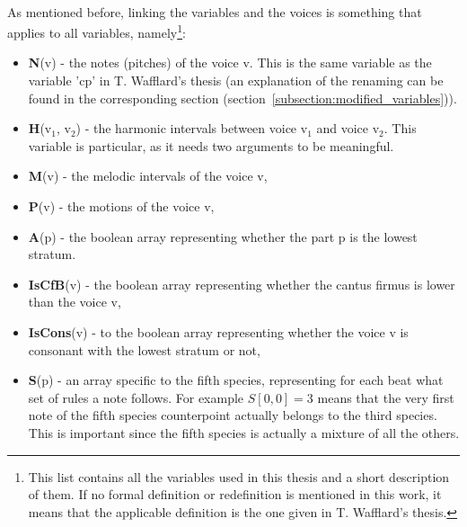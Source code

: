 \paragraph{}
\noindent As mentioned before, linking the variables and the voices is something that applies to all variables, namely\footnote{This list contains all the variables used in this thesis and a short description of them. If no formal definition or redefinition is mentioned in this work, it means that the applicable definition is the one given in T. Wafflard's thesis.}:
\begin{itemize}
    \item \textbf{N}(v) - the notes (pitches) of the voice v. This is the same variable as the variable 'cp' in T. Wafflard's thesis (an explanation of the renaming can be found in the corresponding section (section~\ref{subsection:modified_variables})).
    \item \textbf{H}(v$_1$, v$_2$) - the harmonic intervals between voice v$_1$ and voice v$_2$. This variable is particular, as it needs two arguments to be meaningful.
    \item \textbf{M}(v) - the melodic intervals of the voice v, 
    \item \textbf{P}(v) - the motions of the voice v,
    \item \textbf{A}(p) - the boolean array representing whether the part p is the lowest stratum.
    \item \textbf{IsCfB}(v) - the boolean array representing whether the cantus firmus is lower than the voice v,
    \item \textbf{IsCons}(v) - to the boolean array representing whether the voice v is consonant with the lowest stratum or not,
    \item \textbf{S}(p) - an array specific to the fifth species, representing for each beat what set of rules a note follows. For example $S[0, 0]=3$ means that the very first note of the fifth species counterpoint actually belongs to the third species. This is important since the fifth species is actually a mixture of all the others.
\end{itemize}


